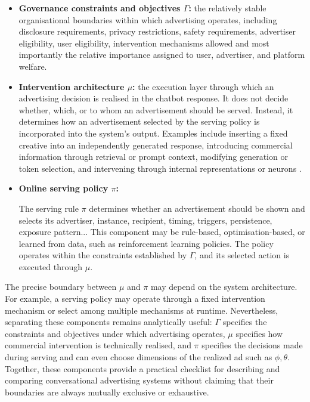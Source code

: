 \documentclass[english]{article}
\begin{document}
\begin{itemize}
    \item \textbf{Governance constraints and objectives \(\Gamma\):}
    the relatively stable organisational boundaries within which advertising
    operates, including disclosure requirements, privacy restrictions, safety
    requirements, advertiser eligibility, user eligibility, intervention mechanisms allowed and most importantly the relative importance assigned to user, advertiser, and platform welfare.

   \item \textbf{Intervention architecture \(\mu\):}
    the execution layer through which an advertising decision is realised in
    the chatbot response. It does not decide whether, which, or to whom an
    advertisement should be served. Instead, it determines how an advertisement
    selected by the serving policy is incorporated into the system's output.
    Examples include inserting a fixed creative into an independently generated
    response, introducing commercial information through retrieval or prompt
    context, modifying generation or token selection, and intervening through
    internal representations or neurons
    \cite{feizi2023online,duetting2024mechanism,xu2026ad,
    yun2026llmadvertisementbasedneuron}.

    \item \textbf{Online serving policy \(\pi\):}

    The serving rule \(\pi\) determines whether an advertisement should be shown and
    selects its advertiser, instance, recipient, timing, triggers, persistence, exposure pattern...
    This component may be rule-based, optimisation-based, or learned from data, such as reinforcement learning policies. The policy operates within
    the constraints established by \(\Gamma\), and its selected action is
    executed through \(\mu\).
\end{itemize}

The precise boundary between \(\mu\) and \(\pi\) may depend on the system
architecture. For example, a serving policy may operate through a fixed
intervention mechanism or select among multiple mechanisms at runtime.
Nevertheless, separating these components remains analytically useful:
\(\Gamma\) specifies the constraints and objectives under which advertising
operates, \(\mu\) specifies how commercial intervention is technically
realised, and \(\pi\) specifies the decisions made during serving and can even choose dimensions of the realized ad such as $\phi, \theta$. Together,
these components provide a practical checklist for describing and comparing
conversational advertising systems without claiming that their boundaries are
always mutually exclusive or exhaustive.
\end{document}
